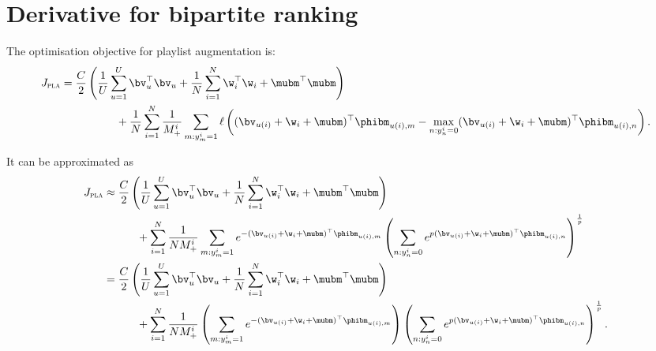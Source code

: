 \section{Derivative for bipartite ranking}

The optimisation objective for playlist augmentation is:
\begin{equation}
\label{eq:primal_pla}
\begin{aligned}
J_\textsc{pla} 
&= \frac{C}{2} \left( \frac{1}{U} \sum_{u=1}^U \bv_u^\top \bv_u 
     + \frac{1}{N} \sum_{i=1}^N \w_i^\top \w_i + \mubm^\top \mubm \right) \\
& \hspace{5em}
     + \frac{1}{N} \sum_{i=1}^N \frac{1}{M_+^i} \sum_{m: y_m^i = 1} \ell \left( (\bv_{u(i)} + \w_i + \mubm)^\top \phibm_{u(i),m}
     - \max_{n: y_n^i = 0} (\bv_{u(i)} + \w_i + \mubm)^\top \phibm_{u(i),n} \right).
\end{aligned}
\end{equation}

It can be approximated as
\begin{equation*}
\begin{aligned}
J_\textsc{pla} 
&\approx \frac{C}{2} \left( \frac{1}{U} \sum_{u=1}^U \bv_u^\top \bv_u + \frac{1}{N} \sum_{i=1}^N \w_i^\top \w_i + \mubm^\top \mubm \right) \\
& \hspace{3em}
  + \sum_{i=1}^N \frac{1}{N M_+^i} \sum_{m: y_m^i = 1} 
    e^{-(\bv_{u(i)} + \w_i + \mubm)^\top \phibm_{u(i),m}}
    \left( \sum_{n: y_n^i = 0} e^{p (\bv_{u(i)} + \w_i + \mubm)^\top \phibm_{u(i),n}} \right)^\frac{1}{p} \\
&= \frac{C}{2} \left( \frac{1}{U} \sum_{u=1}^U \bv_u^\top \bv_u + \frac{1}{N} \sum_{i=1}^N \w_i^\top \w_i + \mubm^\top \mubm \right) \\
& \hspace{3em}
  + \sum_{i=1}^N \frac{1}{N M_+^i} 
    \left( \sum_{m: y_m^i = 1} e^{-(\bv_{u(i)} + \w_i + \mubm)^\top \phibm_{u(i),m}} \right)
    \left( \sum_{n: y_n^i = 0} e^{p (\bv_{u(i)} + \w_i + \mubm)^\top \phibm_{u(i),n}} \right)^\frac{1}{p}.
\end{aligned}
\end{equation*}

